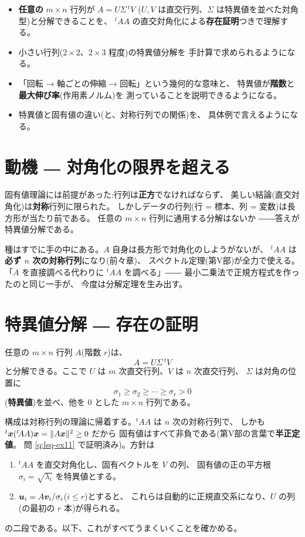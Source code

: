 \begin{goal}
\begin{itemize}
\item \textbf{任意の} $m \times n$ 行列が $A = U\Sigma\,{}^tV$
($U, V$ は直交行列、$\Sigma$ は特異値を並べた対角型)と分解できることを、
${}^t\!AA$ の直交対角化による\textbf{存在証明}つきで理解する。
\item 小さい行列($2 \times 2$、$2 \times 3$ 程度)の特異値分解を
手計算で求められるようになる。
\item 「回転 → 軸ごとの伸縮 → 回転」という幾何的な意味と、
特異値が\textbf{階数}と\textbf{最大伸び率}(作用素ノルム)を
測っていることを説明できるようになる。
\item 特異値と固有値の違い(と、対称行列での関係)を、
具体例で言えるようになる。
\end{itemize}
\end{goal}

\section{動機 ― 対角化の限界を超える}

固有値理論には前提があった:行列は\textbf{正方}でなければならず、
美しい結論(直交対角化)は\textbf{対称}行列に限られた。
しかしデータの行列(行 = 標本、列 = 変数)は長方形が当たり前である。
任意の $m \times n$ 行列に通用する分解はないか
――答えが特異値分解である。

種はすでに手の中にある。$A$ 自身は長方形で対角化のしようがないが、
${}^t\!AA$ は\textbf{必ず $n$ 次の対称行列}になり(前々章)、
スペクトル定理(第V部)が全力で使える。
「$A$ を直接調べる代わりに ${}^t\!AA$ を調べる」――
最小二乗法で正規方程式を作ったのと同じ一手が、
今度は分解定理を生み出す。

\section{特異値分解 ― 存在の証明}

\begin{teiri}[特異値分解]\label{thm:svd-main}
任意の $m \times n$ 行列 $A$(階数 $r$)は、
\[
A = U \Sigma\, {}^t V
\]
と分解できる。ここで $U$ は $m$ 次直交行列、$V$ は $n$ 次直交行列、
$\Sigma$ は対角の位置に
\[
\sigma_1 \ge \sigma_2 \ge \cdots \ge \sigma_r > 0
\]
(\textbf{特異値})を並べ、他を $0$ とした $m \times n$ 行列である。
\end{teiri}

構成は対称行列の理論に帰着する。${}^t\!AA$ は $n$ 次の対称行列で、
しかも ${}^t\bm{x}({}^t\!AA)\bm{x} = \|A\bm{x}\|^2 \ge 0$ だから
固有値はすべて非負である(第V部の言葉で\textbf{半正定値}。
問 \ref{q:lsq-ex11} で証明済み)。方針は
\begin{enumerate}
\item ${}^t\!AA$ を直交対角化し、固有ベクトルを $V$ の列、
固有値の正の平方根 $\sigma_i = \sqrt{\lambda_i}$ を特異値とする。
\item $\bm{u}_i = A\bm{v}_i / \sigma_i$($i \le r$)とすると、
これらは自動的に正規直交系になり、$U$ の列(の最初の $r$ 本)が得られる。
\end{enumerate}
の二段である。以下、これがすべてうまくいくことを確かめる。

